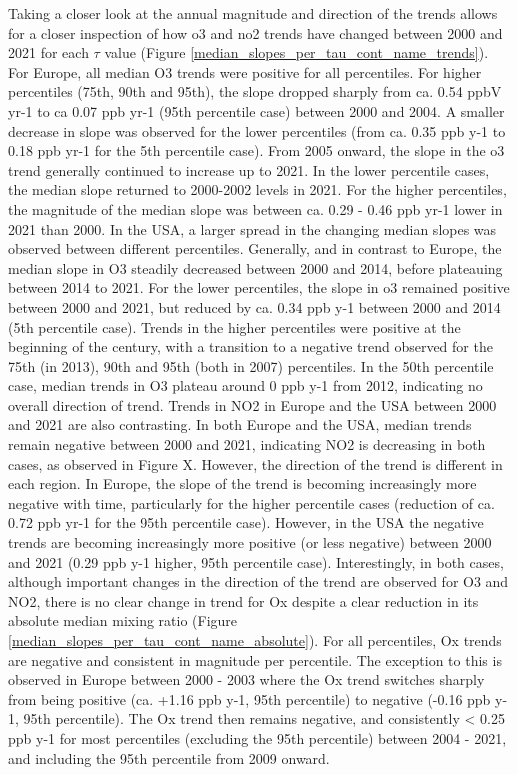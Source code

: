 \documentclass[journal abbreviation, manuscript]{copernicus}
\begin{document}
Taking a closer look at the annual magnitude and direction of the trends allows for a closer inspection of how o3 and no2 trends have changed between 2000 and 2021 for each $\tau$ value (Figure \ref{median_slopes_per_tau_cont_name_trends}). For Europe, all median O3 trends were positive for all percentiles. For higher percentiles (75th, 90th and 95th), the slope dropped sharply from ca. 0.54 ppbV yr-1 to ca 0.07 ppb yr-1 (95th percentile case) between 2000 and 2004. A smaller decrease in slope was observed for the lower percentiles (from ca. 0.35 ppb y-1 to 0.18 ppb yr-1 for the 5th percentile case). From 2005 onward, the slope in the o3 trend generally continued to increase up to 2021. In the lower percentile cases, the median slope returned to 2000-2002 levels in 2021. For the higher percentiles, the magnitude of the median slope was between ca. 0.29 - 0.46 ppb yr-1 lower in 2021 than 2000. In the USA, a larger spread in the changing median slopes was observed between different percentiles. Generally, and in contrast to Europe, the median slope in O3 steadily decreased between 2000 and 2014, before plateauing between 2014 to 2021. For the lower percentiles, the slope in o3 remained positive between 2000 and 2021, but reduced by ca. 0.34 ppb y-1 between 2000 and 2014 (5th percentile case). Trends in the higher percentiles were positive at the beginning of the century, with a transition to a negative trend observed for the 75th (in 2013), 90th and 95th (both in 2007) percentiles. In the 50th percentile case, median trends in O3 plateau around 0 ppb y-1 from 2012, indicating no overall direction of trend. Trends in NO2 in Europe and the USA between 2000 and 2021 are also contrasting. In both Europe and the USA, median trends remain negative between 2000 and 2021, indicating NO2 is decreasing in both cases, as observed in Figure X. However, the direction of the trend is different in each region. In Europe, the slope of the trend is becoming increasingly more negative with time, particularly for the higher percentile cases (reduction of ca. 0.72 ppb yr-1 for the 95th percentile case). However, in the USA the negative trends are becoming increasingly more positive (or less negative) between 2000 and 2021 (0.29 ppb y-1 higher, 95th percentile case). Interestingly, in both cases, although important changes in the direction of the trend are observed for O3 and NO2, there is no clear change in trend for Ox despite a clear reduction in its absolute median mixing ratio (Figure \ref{median_slopes_per_tau_cont_name_absolute}). For all percentiles, Ox trends are negative and consistent in magnitude per percentile. The exception to this is observed in Europe between 2000 - 2003 where the Ox trend switches sharply from being positive (ca. +1.16 ppb y-1, 95th percentile) to negative (-0.16 ppb y-1, 95th percentile). The Ox trend then remains negative, and consistently < 0.25 ppb y-1 for most percentiles (excluding the 95th percentile) between 2004 - 2021, and including the 95th percentile from 2009 onward.
\end{document}
